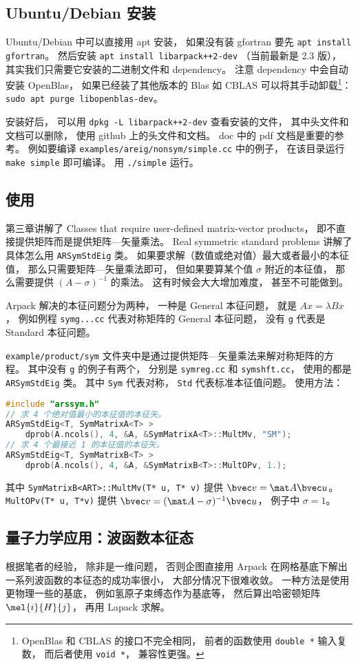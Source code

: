 \subsection{Ubuntu/Debian 安装}
Ubuntu/Debian 中可以直接用 apt 安装， 如果没有装 gfortran 要先 \verb|apt install gfortran|。 然后安装 \verb|apt install libarpack++2-dev| （当前最新是 2.3 版）， 其实我们只需要它安装的二进制文件和 dependency。 注意 dependency 中会自动安装 OpenBlas， 如果已经装了其他版本的 Blas 如 CBLAS 可以将其手动卸载\footnote{OpenBlas 和 CBLAS 的接口不完全相同， 前者的函数使用 \lstinline|double *| 输入复数， 而后者使用 \lstinline|void *|， 兼容性更强。}： \verb|sudo apt purge libopenblas-dev|。

安装好后， 可以用 \verb|dpkg -L libarpack++2-dev| 查看安装的文件， 其中头文件和文档可以删除， 使用 github 上的头文件和文档。 doc 中的 pdf 文档是重要的参考。 例如要编译 \verb|examples/areig/nonsym/simple.cc| 中的例子， 在该目录运行 \verb|make simple| 即可编译。 用 \verb|./simple| 运行。

\subsection{使用}
第三章讲解了 Classes that require user-defined matrix-vector products， 即不直接提供矩阵而是提供矩阵—矢量乘法。 Real symmetric standard problems 讲解了具体怎么用 \verb|ARSymStdEig| 类。 如果要求解（数值或绝对值）最大或者最小的本征值， 那么只需要矩阵—矢量乘法即可， 但如果要算某个值 $\sigma$ 附近的本征值， 那么需要提供 $(A - \sigma)^{-1}$ 的乘法。 这有时候会大大增加难度， 甚至不可能做到。

Arpack 解决的本征问题分为两种， 一种是 General 本征问题， 就是 $Ax = \lambda Bx$， 例如例程 \verb|symg...cc| 代表对称矩阵的 General 本征问题， 没有 \verb|g| 代表是 Standard 本征问题。

\verb|example/product/sym| 文件夹中是通过提供矩阵—矢量乘法来解对称矩阵的方程。 其中没有 \verb|g| 的例子有两个， 分别是 \verb|symreg.cc| 和 \verb|symshft.cc|， 使用的都是 \verb|ARSymStdEig| 类。 其中 \verb|Sym| 代表对称， \verb|Std| 代表标准本征值问题。 使用方法：
\begin{lstlisting}[language=cpp]
#include "arssym.h"
// 求 4 个绝对值最小的本征值的本征矢。
ARSymStdEig<T, SymMatrixA<T> >
    dprob(A.ncols(), 4, &A, &SymMatrixA<T>::MultMv, "SM");
// 求 4 个最接近 1 的本征值的本征矢。
ARSymStdEig<T, SymMatrixB<T> >
    dprob(A.ncols(), 4, &A, &SymMatrixB<T>::MultOPv, 1.);
\end{lstlisting}
其中 \verb|SymMatrixB<ART>::MultMv(T* u, T* v)| 提供 $\bvec v = \mat A\bvec u$。 \verb|MultOPv(T* u, T*v)| 提供 $\bvec v = (\mat A - \sigma)^{-1}\bvec u$， 例子中 $\sigma = 1$。

\subsection{量子力学应用：波函数本征态}
根据笔者的经验， 除非是一维问题， 否则企图直接用 Arpack 在网格基底下解出一系列波函数的本征态的成功率很小， 大部分情况下很难收敛。 一种方法是使用更物理一些的基底， 例如氢原子束缚态作为基底等， 然后算出哈密顿矩阵 $\mel{i}{H}{j}$， 再用 Lapack 求解。
